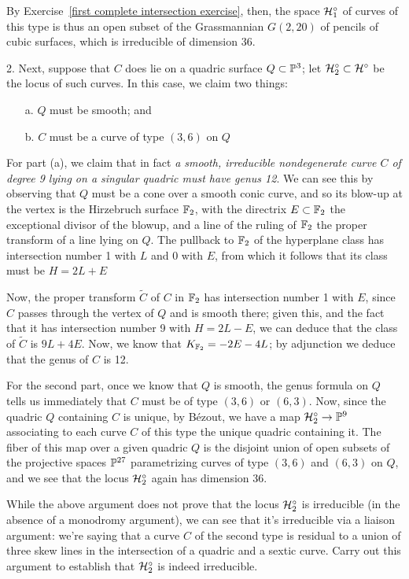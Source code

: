 By Exercise~\ref{first complete intersection exercise}, then, the space ${\cal H}^\circ_1$ of curves of this type is thus an open subset of the Grassmannian $G(2,20)$ of pencils of cubic surfaces, which is irreducible of dimension 36.

2. Next, suppose that $C$ does lie on a quadric surface $Q \subset {\mathbb P}^3$; let ${\cal H}^\circ_2 \subset {\cal H}^\circ$ be the locus of such curves. In this case, we claim two things:
\begin{enumerate}
\item[a.] $Q$ must be smooth; and
\item[b.] $C$ must be a curve of type $(3,6)$ on $Q$
\end{enumerate}

For part (a), we claim that in fact \emph{a smooth, irreducible nondegenerate curve $C$ of degree 9 lying on a singular quadric must have genus 12}. We can see this by observing that $Q$ must be a cone over a smooth conic curve, and so its blow-up at the vertex is the Hirzebruch surface ${\mathbb F}_2$, with the directrix $E \subset {\mathbb F}_2$ the exceptional divisor of the blowup, and a line of the ruling of ${\mathbb F}_2$ the proper transform of a line lying on $Q$. The pullback to ${\mathbb F}_2$ of the hyperplane class has intersection number 1 with $L$ and 0 with $E$, from which it follows that its class must  be $H = 2L + E$

Now, the proper transform $\tilde C$ of $C$ in ${\mathbb F}_2$ has intersection number 1 with $E$, since $C$ passes through the vertex of $Q$ and is smooth there; given this, and the fact that it has intersection number 9 with $H = 2L-E$, we can deduce that the class of $\tilde C$ is $9L + 4E$. Now, we know that $K_{{\mathbb F}_2} = -2E - 4L$; by adjunction we deduce that  the genus of $C$ is 12.

For the second part, once we know that $Q$ is smooth, the genus formula on $Q$ tells us immediately that $C$ must be of type $(3,6)$ or $(6,3)$. Now, since the quadric $Q$ containing $C$ is unique, by B\'ezout, we have a map ${\cal H}^\circ_2 \to {\mathbb P}^9$ associating to each curve $C$ of this type the unique quadric containing it. The fiber of this map over a given quadric $Q$ is the disjoint union of open subsets of the projective spaces ${\mathbb P}^{27}$ parametrizing curves of type $(3,6)$ and $(6,3)$ on $Q$, and we see that the locus ${\cal H}^\circ_2$ again has dimension 36.

\begin{exercise}
While the above argument does not prove that the locus ${\cal H}^\circ_2$ is irreducible (in the absence of a monodromy argument), we can see that it's irreducible via a liaison argument: we're saying that a curve $C$ of the second type is residual to a union of three skew lines in the intersection of a quadric and a sextic curve. Carry out this argument to establish that ${\cal H}^\circ_2$ is indeed irreducible.
\end{exercise}



